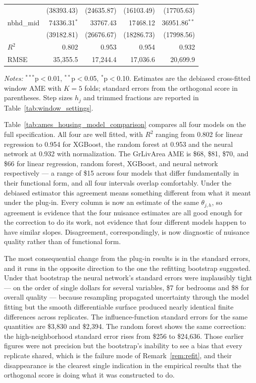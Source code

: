 \documentclass[12pt,a4paper]{article}
\numberwithin{equation}{section}
\theoremstyle{plain}
\theoremstyle{definition}
\begin{document}
\begin{table}[htbp]
\begin{threeparttable}
\begin{tabular}{lrrrr}
				& (38393.43) & (24635.87) & (16103.49) & (17705.63) \\
				nbhd\_mid & 74336.31$^{*}$ & 33767.43 & 17468.12 & 36951.86$^{**}$ \\
				& (39182.81) & (26676.67) & (18286.73) & (17998.56) \\
				\midrule
				$R^2$ & 0.802 & 0.953 & 0.954 & 0.932 \\
				RMSE & 35,355.5 & 17,244.4 & 17,036.6 & 20,699.9 \\
				\bottomrule
				\end{tabular}
				\begin{tablenotes}
				\footnotesize
				\item \textit{Notes:} $^{***}$p$<$0.01, $^{**}$p$<$0.05, $^{*}$p$<$0.10. Estimates are the debiased cross-fitted window AME with $K=5$ folds; standard errors from the orthogonal score in parentheses. Step sizes $h_j$ and trimmed fractions are reported in Table~\ref{tab:window_settings}.
				\end{tablenotes}
		\end{threeparttable}
	\end{table}
	
	Table~\ref{tab:ames_housing_model_comparison} compares all four models on the full specification. All four are well fitted, with $R^2$ ranging from 0.802 for linear regression to 0.954 for XGBoost, the random forest at 0.953 and the neural network at 0.932 with normalization. The GrLivArea AME is \$68, \$81, \$70, and \$66 for linear regression, random forest, XGBoost, and neural network respectively --- a range of \$15 across four models that differ fundamentally in their functional form, and all four intervals overlap comfortably. Under the debiased estimator this agreement means something different from what it meant under the plug-in. Every column is now an estimate of the same $\theta_{j,h}$, so agreement is evidence that the four nuisance estimates are all good enough for the correction to do its work, not evidence that four different models happen to have similar slopes. Disagreement, correspondingly, is now diagnostic of nuisance quality rather than of functional form.

	The most consequential change from the plug-in results is in the standard errors, and it runs in the opposite direction to the one the refitting bootstrap suggested. Under that bootstrap the neural network's standard errors were implausibly tight --- on the order of single dollars for several variables, \$7 for bedrooms and \$8 for overall quality --- because resampling propagated uncertainty through the model fitting but the smooth differentiable surface produced nearly identical finite differences across replicates. The influence-function standard errors for the same quantities are \$3,830 and \$2,394. The random forest shows the same correction: the high-neighborhood standard error rises from \$256 to \$24,636. Those earlier figures were not precision but the bootstrap's inability to see a bias that every replicate shared, which is the failure mode of Remark~\ref{rem:refit}, and their disappearance is the clearest single indication in the empirical results that the orthogonal score is doing what it was constructed to do.
\end{document}
